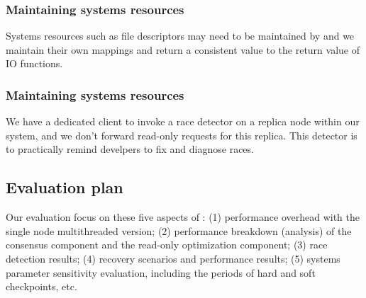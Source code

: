 \subsubsection{Maintaining systems resources} \label{sec:re-resource}
Systems resources such as file descriptors may need to be maintained by 
\msmr and we maintain their own mappings and return a consistent value to the 
return value of IO functions.

\subsubsection{Maintaining systems resources} \label{sec:rep-race}
We have a dedicated client to invoke a race detector on a replica node within our system, 
and we don't forward read-only requests for this replica. This detector is to 
practically remind develpers to fix and diagnose races.

\subsection{Evaluation plan} \label{sec:rep-eval}
Our evaluation focus on these five aspects of \msmr: (1) performance overhead with the single node multithreaded 
version; (2) performance breakdown (analysis) of the consensus component and the read-only optimization 
component; (3) race detection results; (4) recovery scenarios and performance 
results; (5) systems parameter sensitivity evaluation, including the periods of hard and soft checkpoints, etc.







